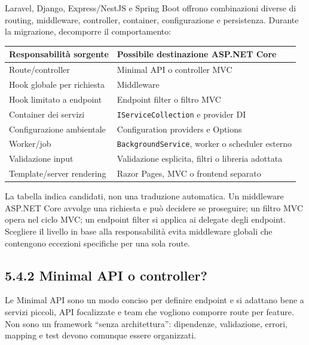 \documentclass[
  italian,
  10pt,
]{book}
\newcounter{none} %
\begin{document}
Laravel, Django, Express/NestJS e Spring Boot offrono combinazioni
diverse di routing, middleware, controller, container, configurazione e
persistenza. Durante la migrazione, decomporre il comportamento:

{\def\LTcaptype{none} %
\begin{longtable}[]{@{}
  >{\raggedright\arraybackslash}p{}
  >{\raggedright\arraybackslash}p{}@{}}
\toprule\noalign{}
\begin{minipage}[b]{\linewidth}\raggedright
Responsabilità sorgente
\end{minipage} & \begin{minipage}[b]{\linewidth}\raggedright
Possibile destinazione ASP.NET Core
\end{minipage} \\
\midrule\noalign{}
\endhead
\bottomrule\noalign{}
\endlastfoot
Route/controller & Minimal API o controller MVC \\
Hook globale per richiesta & Middleware \\
Hook limitato a endpoint & Endpoint filter o filtro MVC \\
Container dei servizi & \texttt{IServiceCollection} e provider DI \\
Configurazione ambientale & Configuration providers e Options \\
Worker/job & \texttt{BackgroundService}, worker o scheduler esterno \\
Validazione input & Validazione esplicita, filtri o libreria adottata \\
Template/server rendering & Razor Pages, MVC o frontend separato \\
\end{longtable}
}

La tabella indica candidati, non una traduzione automatica. Un
middleware ASP.NET Core avvolge una richiesta e può decidere se
proseguire; un filtro MVC opera nel ciclo MVC; un endpoint filter si
applica ai delegate degli endpoint. Scegliere il livello in base alla
responsabilità evita middleware globali che contengono eccezioni
specifiche per una sola route.

\subsection{5.4.2 Minimal API o
controller?}\label{minimal-api-o-controller}

Le Minimal API sono un modo conciso per definire endpoint e si adattano
bene a servizi piccoli, API focalizzate e team che vogliono comporre
route per feature. Non sono un framework ``senza architettura'':
dipendenze, validazione, errori, mapping e test devono comunque essere
organizzati.
\end{document}
